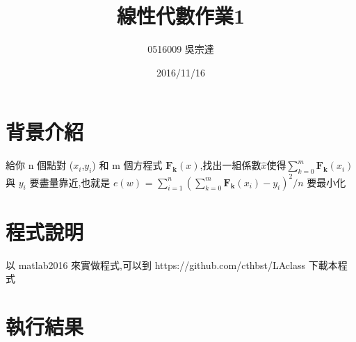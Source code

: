 \documentclass[a4paper,margin=1in]{article}
\title{線性代數作業1}
\author{0516009 吳宗達}
\date{2016/11/16}
\begin{document}
\large
{}
\maketitle

\section{背景介紹}
給你 n 個點對 ($\mathit{x_{i}}$,$\mathit{y_{i}}$) 和 m 個方程式 $\mathbf{F_{k}}(x)$,找出一組係數$\widehat{x}$使得$\sum_{k=0}^{m}\mathbf{F_{k}}(x_{i})$ 與 $y_{i}$ 要盡量靠近,也就是 $e(w)$ = $\sum_{i=1}^{n}(\sum_{k=0}^{m}\mathbf{F_{k}}(x_{i})-y_{i})^2/n$ 要最小化

\section{程式說明}
以 matlab2016 來實做程式,可以到 https://github.com/cthbst/LAclass 下載本程式

\newpage
\section{執行結果}
\end{document}

